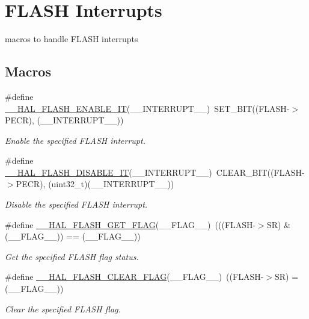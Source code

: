 \hypertarget{group___f_l_a_s_h___interrupt}{\section{F\-L\-A\-S\-H Interrupts}
\label{group___f_l_a_s_h___interrupt}
}


macros to handle F\-L\-A\-S\-H interrupts  


\subsection*{Macros}
\begin{DoxyCompactItemize}
\item 
\#define \hyperlink{group___f_l_a_s_h___interrupt_ga13fa137a911f02a2f94fb9fb0762a340}{\-\_\-\-\_\-\-H\-A\-L\-\_\-\-F\-L\-A\-S\-H\-\_\-\-E\-N\-A\-B\-L\-E\-\_\-\-I\-T}(\-\_\-\-\_\-\-I\-N\-T\-E\-R\-R\-U\-P\-T\-\_\-\-\_\-)~S\-E\-T\-\_\-\-B\-I\-T((F\-L\-A\-S\-H-\/$>$P\-E\-C\-R), (\-\_\-\-\_\-\-I\-N\-T\-E\-R\-R\-U\-P\-T\-\_\-\-\_\-))
\begin{DoxyCompactList}\small\item\em Enable the specified F\-L\-A\-S\-H interrupt. \end{DoxyCompactList}\item 
\#define \hyperlink{group___f_l_a_s_h___interrupt_ga1f40f507b5d4b3a4da68e4244a1097ee}{\-\_\-\-\_\-\-H\-A\-L\-\_\-\-F\-L\-A\-S\-H\-\_\-\-D\-I\-S\-A\-B\-L\-E\-\_\-\-I\-T}(\-\_\-\-\_\-\-I\-N\-T\-E\-R\-R\-U\-P\-T\-\_\-\-\_\-)~C\-L\-E\-A\-R\-\_\-\-B\-I\-T((F\-L\-A\-S\-H-\/$>$P\-E\-C\-R), (uint32\-\_\-t)(\-\_\-\-\_\-\-I\-N\-T\-E\-R\-R\-U\-P\-T\-\_\-\-\_\-))
\begin{DoxyCompactList}\small\item\em Disable the specified F\-L\-A\-S\-H interrupt. \end{DoxyCompactList}\item 
\#define \hyperlink{group___f_l_a_s_h___interrupt_ga0d3dd161fecc0e47c9e109c7c28672c1}{\-\_\-\-\_\-\-H\-A\-L\-\_\-\-F\-L\-A\-S\-H\-\_\-\-G\-E\-T\-\_\-\-F\-L\-A\-G}(\-\_\-\-\_\-\-F\-L\-A\-G\-\_\-\-\_\-)~(((F\-L\-A\-S\-H-\/$>$S\-R) \& (\-\_\-\-\_\-\-F\-L\-A\-G\-\_\-\-\_\-)) == (\-\_\-\-\_\-\-F\-L\-A\-G\-\_\-\-\_\-))
\begin{DoxyCompactList}\small\item\em Get the specified F\-L\-A\-S\-H flag status. \end{DoxyCompactList}\item 
\#define \hyperlink{group___f_l_a_s_h___interrupt_ga68e49c4675761e2ec35153e747de7622}{\-\_\-\-\_\-\-H\-A\-L\-\_\-\-F\-L\-A\-S\-H\-\_\-\-C\-L\-E\-A\-R\-\_\-\-F\-L\-A\-G}(\-\_\-\-\_\-\-F\-L\-A\-G\-\_\-\-\_\-)~((F\-L\-A\-S\-H-\/$>$S\-R) = (\-\_\-\-\_\-\-F\-L\-A\-G\-\_\-\-\_\-))
\begin{DoxyCompactList}\small\item\em Clear the specified F\-L\-A\-S\-H flag. \end{DoxyCompactList}\end{DoxyCompactItemize}


